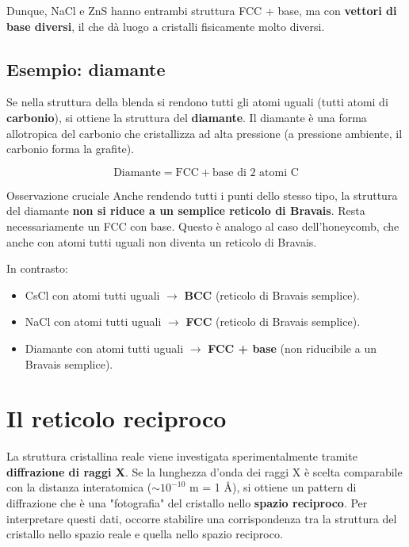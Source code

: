 Dunque, NaCl e ZnS hanno entrambi struttura FCC + base, ma con \textbf{vettori di base diversi}, il che dà luogo a cristalli fisicamente molto diversi.

\subsection*{Esempio: diamante}

Se nella struttura della blenda si rendono tutti gli atomi uguali (tutti atomi di \textbf{carbonio}), si ottiene la struttura del \textbf{diamante}. Il diamante è una forma allotropica del carbonio che cristallizza ad alta pressione (a pressione ambiente, il carbonio forma la grafite).

$$\text{Diamante} = \text{FCC} + \text{base di 2 atomi C}$$

\begin{definizione}{Osservazione cruciale}
Anche rendendo tutti i punti dello stesso tipo, la struttura del diamante \textbf{non si riduce a un semplice reticolo di Bravais}. Resta necessariamente un FCC con base. Questo è analogo al caso dell'honeycomb, che anche con atomi tutti uguali non diventa un reticolo di Bravais.
\end{definizione}

In contrasto:
\begin{itemize}
    \item CsCl con atomi tutti uguali $\to$ \textbf{BCC} (reticolo di Bravais semplice).
    \item NaCl con atomi tutti uguali $\to$ \textbf{FCC} (reticolo di Bravais semplice).
    \item Diamante con atomi tutti uguali $\to$ \textbf{FCC + base} (non riducibile a un Bravais semplice).
\end{itemize}

\section{Il reticolo reciproco}

La struttura cristallina reale viene investigata sperimentalmente tramite \textbf{diffrazione di raggi X}. Se la lunghezza d'onda dei raggi X è scelta comparabile con la distanza interatomica ($\sim 10^{-10}$ m = 1 Å), si ottiene un pattern di diffrazione che è una "fotografia" del cristallo nello \textbf{spazio reciproco}. Per interpretare questi dati, occorre stabilire una corrispondenza tra la struttura del cristallo nello spazio reale e quella nello spazio reciproco.

